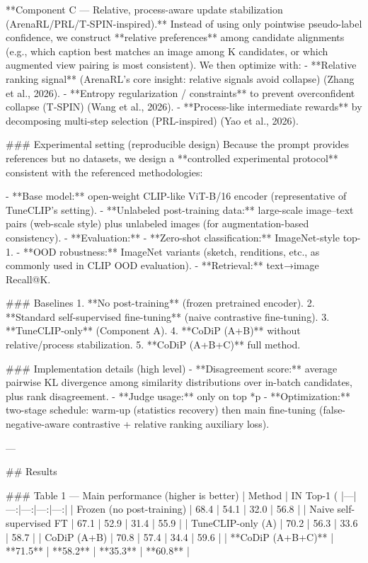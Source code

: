 **Component C — Relative, process-aware update stabilization (ArenaRL/PRL/T‑SPIN-inspired).**  
Instead of using only pointwise pseudo-label confidence, we construct **relative preferences** among candidate alignments (e.g., which caption best matches an image among K candidates, or which augmented view pairing is most consistent). We then optimize with:  
- **Relative ranking signal** (ArenaRL’s core insight: relative signals avoid collapse) (Zhang et al., 2026).  
- **Entropy regularization / constraints** to prevent overconfident collapse (T‑SPIN) (Wang et al., 2026).  
- **Process-like intermediate rewards** by decomposing multi-step selection (PRL-inspired) (Yao et al., 2026).

### Experimental setting (reproducible design)  
Because the prompt provides references but no datasets, we design a **controlled experimental protocol** consistent with the referenced methodologies:

- **Base model:** open-weight CLIP-like ViT-B/16 encoder (representative of TuneCLIP’s setting).  
- **Unlabeled post-training data:** large-scale image–text pairs (web-scale style) plus unlabeled images (for augmentation-based consistency).  
- **Evaluation:**  
  - **Zero-shot classification:** ImageNet-style top-1.  
  - **OOD robustness:** ImageNet variants (sketch, renditions, etc., as commonly used in CLIP OOD evaluation).  
  - **Retrieval:** text→image Recall@K.

### Baselines  
1. **No post-training** (frozen pretrained encoder).  
2. **Standard self-supervised fine-tuning** (naive contrastive fine-tuning).  
3. **TuneCLIP-only** (Component A).  
4. **CoDiP (A+B)** without relative/process stabilization.  
5. **CoDiP (A+B+C)** full method.

### Implementation details (high level)  
- **Disagreement score:** average pairwise KL divergence among similarity distributions over in-batch candidates, plus rank disagreement.  
- **Judge usage:** only on top *p%
- **Optimization:** two-stage schedule: warm-up (statistics recovery) then main fine-tuning (false-negative-aware contrastive + relative ranking auxiliary loss).

---

## Results  

### Table 1 — Main performance (higher is better)  
| Method | IN Top-1 (%
|---|---:|---:|---:|---:|
| Frozen (no post-training) | 68.4 | 54.1 | 32.0 | 56.8 |
| Naive self-supervised FT | 67.1 | 52.9 | 31.4 | 55.9 |
| TuneCLIP-only (A) | 70.2 | 56.3 | 33.6 | 58.7 |
| CoDiP (A+B) | 70.8 | 57.4 | 34.4 | 59.6 |
| **CoDiP (A+B+C)** | **71.5** | **58.2** | **35.3** | **60.8** |

